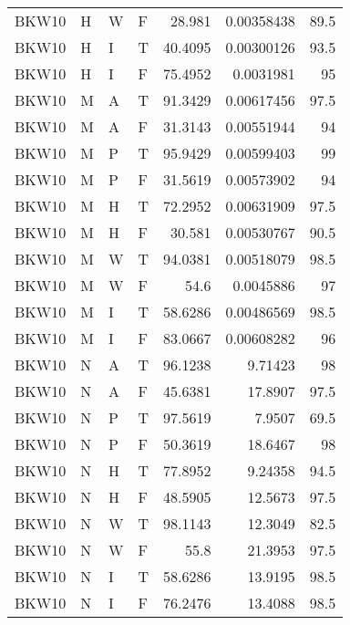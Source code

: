\begin{table}[htb!]
{\begin{tabular}{llllrrr}
            BKW10    & H     & W     & F          & 28.981     & 0.00358438 & 89.5     \\
            BKW10    & H     & I     & T          & 40.4095    & 0.00300126 & 93.5     \\
            BKW10    & H     & I     & F          & 75.4952    & 0.0031981  & 95       \\
            BKW10    & M     & A     & T          & 91.3429    & 0.00617456 & 97.5     \\
            BKW10    & M     & A     & F          & 31.3143    & 0.00551944 & 94       \\
            BKW10    & M     & P     & T          & 95.9429    & 0.00599403 & 99       \\
            BKW10    & M     & P     & F          & 31.5619    & 0.00573902 & 94       \\
            BKW10    & M     & H     & T          & 72.2952    & 0.00631909 & 97.5     \\
            BKW10    & M     & H     & F          & 30.581     & 0.00530767 & 90.5     \\
            BKW10    & M     & W     & T          & 94.0381    & 0.00518079 & 98.5     \\
            BKW10    & M     & W     & F          & 54.6       & 0.0045886  & 97       \\
            BKW10    & M     & I     & T          & 58.6286    & 0.00486569 & 98.5     \\
            BKW10    & M     & I     & F          & 83.0667    & 0.00608282 & 96       \\
            BKW10    & N     & A     & T          & 96.1238    & 9.71423    & 98       \\
            BKW10    & N     & A     & F          & 45.6381    & 17.8907    & 97.5     \\
            BKW10    & N     & P     & T          & 97.5619    & 7.9507     & 69.5     \\
            BKW10    & N     & P     & F          & 50.3619    & 18.6467    & 98       \\
            BKW10    & N     & H     & T          & 77.8952    & 9.24358    & 94.5     \\
            BKW10    & N     & H     & F          & 48.5905    & 12.5673    & 97.5     \\
            BKW10    & N     & W     & T          & 98.1143    & 12.3049    & 82.5     \\
            BKW10    & N     & W     & F          & 55.8       & 21.3953    & 97.5     \\
            BKW10    & N     & I     & T          & 58.6286    & 13.9195    & 98.5     \\
            BKW10    & N     & I     & F          & 76.2476    & 13.4088    & 98.5     \\
            \hline
        \end{tabular}
    }{
    }
\end{table} 
